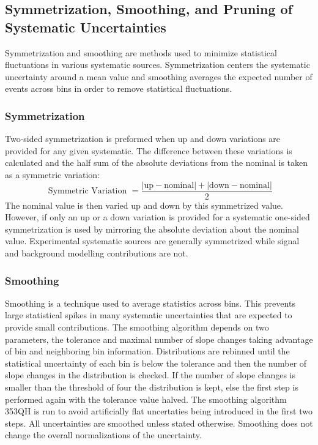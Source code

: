 \subsection{Symmetrization, Smoothing, and Pruning of Systematic Uncertainties}

Symmetrization and smoothing are methods used to minimize statistical fluctuations in various systematic sources.  Symmetrization centers the systematic uncertainty around a mean value and smoothing averages the expected number of events across bins in order to remove statistical fluctuations.

\subsubsection{Symmetrization}
Two-sided symmetrization is preformed when up and down variations are provided for any given systematic.  The difference between these variations is calculated and the half sum of the absolute deviations from the nominal is taken as a symmetric variation:
\[ \text{ Symmetric Variation } = \frac{|\text{up} - \text{nominal}| +|\text{down}-\text{nominal}|}{2}  \]
The nominal value is then varied up and down by this symmetrized value.  However, if only an up or a down variation is provided for a systematic one-sided symmetrization is used by mirroring the absolute deviation about the nominal value.  Experimental systematic sources are generally symmetrized while signal and background modelling contributions are not.

\subsubsection{Smoothing}
Smoothing is a technique used to average statistics across bins.  This prevents large statistical spikes in many systematic uncertainties that are expected to provide small contributions.  The smoothing algorithm depends on two parameters, the tolerance and maximal number of slope changes taking advantage of bin and neighboring bin information.  Distributions are rebinned until the statistical uncertainty of each bin is below the tolerance and then the number of slope changes in the distribution is checked.  If the number of slope changes is smaller than the threshold of four the distribution is kept, else the first step is performed again with the tolerance value halved.  The smoothing algorithm 353QH \cite{Friedman:695770} is run to avoid artificially flat uncertaties being introduced in the first two steps.  All uncertainties are smoothed unless stated otherwise.  Smoothing does not change the overall normalizations of the uncertainty.

